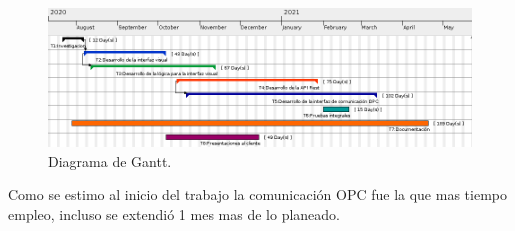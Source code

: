 \begin{figure}[htpb]
	\centering
	\includegraphics[width=14cm]{./Figures/gantt_1.png}
	\caption{Diagrama de Gantt\protect\footnotemark.}
	\label{figure:gantt}
\end{figure}

Como se estimo al inicio del trabajo la comunicación OPC fue la que mas tiempo empleo, incluso se extendió 1 mes mas de lo planeado. 